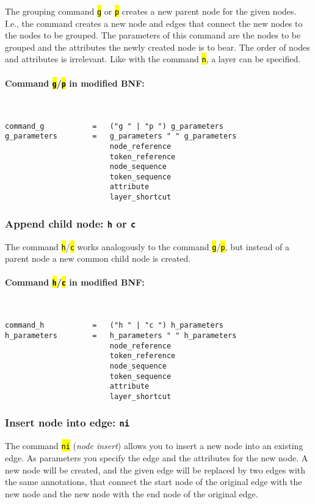 \documentclass[12pt]{scrartcl}
\newcommand{\code}[1]{\hl{\texttt{#1}}}
\begin{document}
The grouping command \code{g} or \code{p} creates a new parent node for the given nodes.
I.e., the command creates a new node and edges that connect the new nodes to the nodes to be grouped.
The parameters of this command are the nodes to be grouped and the attributes the newly created node is to bear.
The order of nodes and attributes is irrelevant.
Like with the command \code{n}, a layer can be specified.

\paragraph*{Command \code{g}/\code{p} in modified BNF:}
~
\begin{lstlisting}
command_g           =   ("g " | "p ") g_parameters
g_parameters        =   g_parameters " " g_parameters
                        node_reference
                        token_reference
                        node_sequence
                        token_sequence
                        attribute
                        layer_shortcut
\end{lstlisting}


\subsubsection{Append child node: \texttt{h} or \texttt{c}}

The command \code{h}/\code{c} works analogously to the command \code{g}/\code{p}, but instead of a parent node a new common child node is created.

\paragraph*{Command \code{h}/\code{c} in modified BNF:}
~
\begin{lstlisting}
command_h           =   ("h " | "c ") h_parameters
h_parameters        =   h_parameters " " h_parameters
                        node_reference
                        token_reference
                        node_sequence
                        token_sequence
                        attribute
                        layer_shortcut
\end{lstlisting}


\subsubsection{Insert node into edge: \texttt{ni}}

The command \code{ni} (\textit{node insert}) allows you to insert a new node into an existing edge.
As parameters you specify the edge and the attributes for the new node.
A new node will be created, and the given edge will be replaced by two edges with the same annotations, that connect the start node of the original edge with the new node and the new node with the end node of the original edge.
\end{document}
